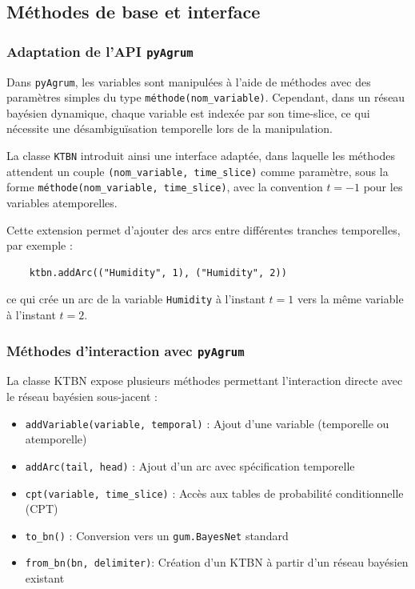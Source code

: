 \documentclass{article}
\begin{document}
\subsection{Méthodes de base et interface}

\subsubsection{Adaptation de l'API \texttt{pyAgrum}}

Dans \texttt{pyAgrum}, les variables sont manipulées à l'aide de méthodes avec des paramètres simples du type
\texttt{méthode(nom\_variable)}. Cependant, dans un réseau bayésien dynamique, chaque variable est indexée par son
time-slice, ce qui nécessite une désambiguïsation temporelle lors de la manipulation.

La classe \texttt{KTBN} introduit ainsi une interface adaptée, dans laquelle les méthodes attendent un couple
\texttt{(nom\_variable, time\_slice)} comme paramètre, sous la forme \texttt{méthode(nom\_variable, time\_slice)},
avec la convention $t=-1$ pour les variables atemporelles.

Cette extension permet d'ajouter des arcs entre différentes tranches temporelles, par exemple :

\begin{lstlisting}
    ktbn.addArc(("Humidity", 1), ("Humidity", 2))
\end{lstlisting}

ce qui crée un arc de la variable \texttt{Humidity} à l'instant $t = 1$ vers la même variable à l'instant $t = 2$.

\subsubsection{Méthodes d'interaction avec \texttt{pyAgrum}}

La classe KTBN expose plusieurs méthodes permettant l'interaction directe avec le réseau bayésien sous-jacent :

\begin{itemize}
    \item \texttt{addVariable(variable, temporal)} : Ajout d'une variable (temporelle ou atemporelle)
    \item \texttt{addArc(tail, head)} : Ajout d'un arc avec spécification temporelle
    \item \texttt{cpt(variable, time\_slice)} : Accès aux tables de probabilité conditionnelle (CPT)
    \item \texttt{to\_bn()} : Conversion vers un \texttt{gum.BayesNet} standard
    \item \texttt{from\_bn(bn, delimiter)}: Création d'un KTBN à partir d'un réseau bayésien existant
\end{itemize}
\end{document}
